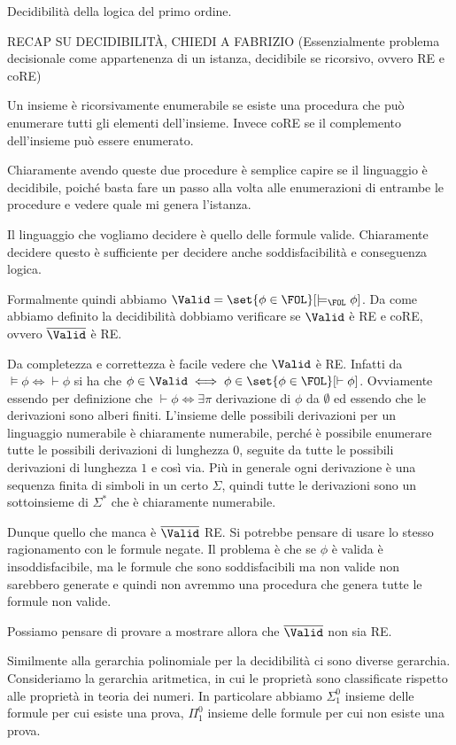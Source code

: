 

Decidibilità della logica del primo ordine.

RECAP SU DECIDIBILITÀ, CHIEDI A FABRIZIO
(Essenzialmente problema decisionale come appartenenza di un istanza, decidibile se ricorsivo, ovvero RE e coRE)

Un insieme è ricorsivamente enumerabile se esiste una procedura che può enumerare tutti gli elementi dell'insieme. Invece coRE se il complemento dell'insieme può essere enumerato. 

Chiaramente avendo queste due procedure è semplice capire se il linguaggio è decidibile, poiché basta fare un passo alla volta alle enumerazioni di entrambe le procedure e vedere quale mi genera l'istanza.

Il linguaggio che vogliamo decidere è quello delle formule valide. Chiaramente decidere questo è sufficiente per decidere anche soddisfacibilità e conseguenza logica.

Formalmente quindi abbiamo \(\Valid = \set{\phi \in \FOL}[\models_{\FOL}\phi]\). Da come abbiamo definito la decidibilità dobbiamo verificare se \(\Valid\) è RE e coRE, ovvero \(\overline{\Valid}\) è RE\@.

Da completezza e correttezza è facile vedere che \(\Valid\) è RE\@. Infatti da \(\models \phi \iff \vdash \phi\) si ha che \(\phi \in \Valid \iff \phi \in \set{\phi \in \FOL}[\vdash \phi]\). Ovviamente essendo per definizione che \(\vdash \phi \iff \exists \pi\) derivazione di \(\phi\) da \(\emptyset\) ed essendo che le derivazioni sono alberi finiti. L'insieme delle possibili derivazioni per un linguaggio numerabile è chiaramente numerabile, perché è possibile enumerare tutte le possibili derivazioni di lunghezza \(0\), seguite da tutte le possibili derivazioni di lunghezza \(1\) e così via. Più in generale ogni derivazione è una sequenza finita di simboli in un certo \(\Sigma\), quindi tutte le derivazioni sono un sottoinsieme di \(\Sigma^*\) che è chiaramente numerabile. 

Dunque quello che manca è \(\overline{\Valid}\) RE\@. Si potrebbe pensare di usare lo stesso ragionamento con le formule negate. Il problema è che se \(\phi\) è valida è insoddisfacibile, ma le formule che sono soddisfacibili ma non valide non sarebbero generate e quindi non avremmo una procedura che genera tutte le formule non valide.

Possiamo pensare di provare a mostrare allora che \(\overline{\Valid}\) non sia RE\@. 

Similmente alla gerarchia polinomiale per la decidibilità ci sono diverse gerarchia. Consideriamo la gerarchia aritmetica, in cui le proprietà sono classificate rispetto alle proprietà in teoria dei numeri. In particolare abbiamo \(\Sigma_1^0\) insieme delle formule per cui esiste una prova, \(\Pi_1^0\) insieme delle formule per cui non esiste una prova.

